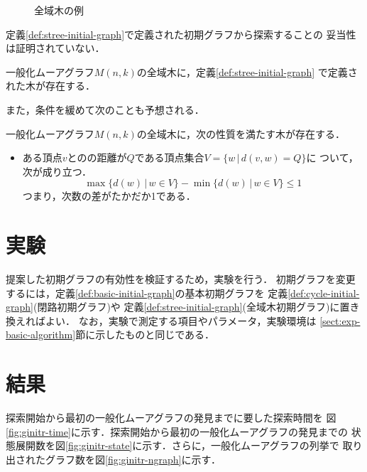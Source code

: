 \begin{figure}
  \centering
  \hfill
  \caption{全域木の例}
  \label{fig:initial-spanning-tree-example}
\end{figure}

定義\ref{def:stree-initial-graph}で定義された初期グラフから探索することの
妥当性は証明されていない．
\begin{conjecture}
  \label{conj:spanning-tree}
  一般化ムーアグラフ$M(n,k)$の全域木に，定義\ref{def:stree-initial-graph}
  で定義された木が存在する．
\end{conjecture}
また，条件を緩めて次のことも予想される．
\begin{conjecture}
  \label{conj:spanning-tree-2}
  一般化ムーアグラフ$M(n,k)$の全域木に，次の性質を満たす木が存在する．
  \begin{itemize}
  \item ある頂点$v$とのの距離が$Q$である頂点集合$V=\{w\,|\,d(v,w)=Q\}$に
    ついて，次が成り立つ． \\
    \[ \max\{d(w)\,|\,w\in V\}-\min\{d(w)\,|\,w\in V\}\leq 1 \]
    つまり，次数の差がたかだか1である．
  \end{itemize}
\end{conjecture}

\section{実験}
\label{sect:exp-reduce-by-initial}
提案した初期グラフの有効性を検証するため，実験を行う．
初期グラフを変更するには，定義\ref{def:basic-initial-graph}の基本初期グラフを
定義\ref{def:cycle-initial-graph}(閉路初期グラフ)や
定義\ref{def:stree-initial-graph}(全域木初期グラフ)に置き換えればよい．
なお，実験で測定する項目やパラメータ，実験環境は
\ref{sect:exp-basic-algorithm}節に示したものと同じである．

\section{結果}
\label{sect:result-reduce-by-initial}
探索開始から最初の一般化ムーアグラフの発見までに要した探索時間を
図\ref{fig:ginitr-time}に示す．探索開始から最初の一般化ムーアグラフの発見までの
状態展開数を図\ref{fig:ginitr-state}に示す．さらに，一般化ムーアグラフの列挙で
取り出されたグラフ数を図\ref{fig:ginitr-ngraph}に示す．

